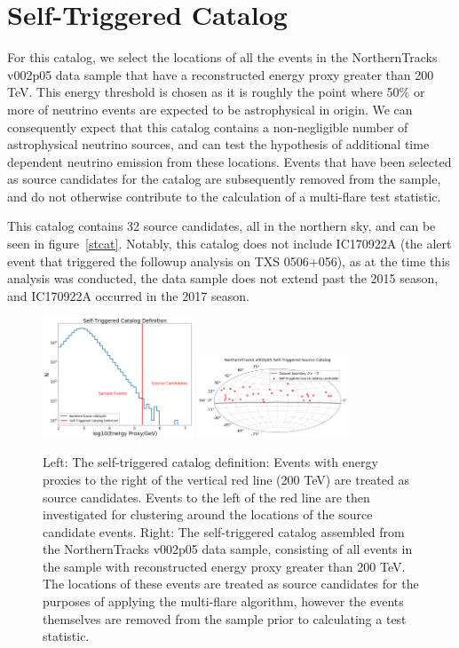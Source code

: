 \section{Self-Triggered Catalog}
For this catalog, we select the locations of all the events in the NorthernTracks v002p05 data sample that have a reconstructed energy proxy greater than 200 TeV. This energy threshold is chosen as it is roughly the point where 50\% or more of neutrino events are expected to be astrophysical in origin. We can consequently expect that this catalog contains a non-negligible number of astrophysical neutrino sources, and can test the hypothesis of additional time dependent neutrino emission from these locations. Events that have been selected as source candidates for the catalog are subsequently removed from the sample, and do not otherwise contribute to the calculation of a multi-flare test statistic. 

This catalog contains 32 source candidates, all in the northern sky, and can be seen in figure~\ref{stcat}. Notably, this catalog does not include IC170922A (the alert event that triggered the followup analysis on TXS 0506+056), as at the time this analysis was conducted, the data sample does not extend past the 2015 season, and IC170922A occurred in the 2017 season. 

\begin{figure}[h]
\centering
\includegraphics[width=0.4\textwidth]{figs/stcat_def.png}
\includegraphics[width=0.4\textwidth]{figs/Selftriggeredcat.png}
\caption{Left: The self-triggered catalog definition: Events with energy proxies to the right of the vertical red line (200 TeV) are treated as source candidates. Events to the left of the red line are then investigated for clustering around the locations of the source candidate events. Right: The self-triggered catalog assembled from the NorthernTracks v002p05 data sample, consisting of all events in the sample with reconstructed energy proxy greater than 200 TeV. The locations of these events are treated as source candidates for the purposes of applying the multi-flare algorithm, however the events themselves are removed from the sample prior to calculating a test statistic.}
\label{fig:stcat}
\end{figure}


